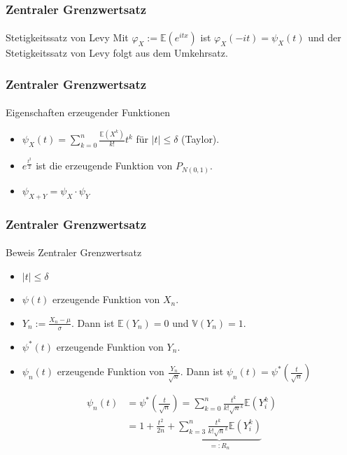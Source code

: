 \documentclass{beamer}
\begin{document}
\begin{frame}
    \frametitle{Zentraler Grenzwertsatz}
\framesubtitle{}

\begin{block}{Stetigkeitssatz von Levy}
Mit $\varphi_{X} := \mathbb{E}(e^{i tx})$  ist $\varphi _{X}(-it)=\psi_{X}(t)$ und der Stetigkeitssatz von Levy folgt aus dem Umkehrsatz.
\end{block}
 \end{frame}




\begin{frame}
    \frametitle{Zentraler Grenzwertsatz}
\framesubtitle{}
\begin{block}{Eigenschaften erzeugender Funktionen}
\begin{itemize}
\item $\psi_X(t) = \sum_{k= 0}^n \frac{\mathbb{E}(X^k)}{k!} t^k$ für $|t| \leq \delta$ (Taylor).
\item $e^{\frac{t^2}{2}}$ ist die erzeugende Funktion von $ P_{N(0,1)}$.
\item $\psi_{X +Y} = \psi_X \cdot \psi_Y$
\end{itemize}

\end{block}


 \end{frame}




\begin{frame}
    \frametitle{Zentraler Grenzwertsatz}
\framesubtitle{}

\begin{block}{Beweis Zentraler Grenzwertsatz}
\begin{itemize}
\item $|t| \leq \delta$
\item $\psi(t)$ erzeugende Funktion von $X_n$.
\item $Y_n := \frac{X_n - \mu}{\sigma}$. Dann ist $\mathbb{E}(Y_n) = 0$ und $\mathbb{V}(Y_n) = 1$.
\item $\psi^*(t)$ erzeugende Funktion von $Y_n$.
\item $\psi_n(t)$ erzeugende Funktion von $\frac{Y_n}{\sqrt{n}}$. Dann ist $\psi_n(t) = \psi^*(\frac{t}{\sqrt{n}})$ 
\end{itemize}
\begin{align*}
\psi_n(t) &= \psi^*(\frac{t}{\sqrt{n}}) =  \sum_{k= 0}^n \frac{t^k }{k! \sqrt{n}^k} \mathbb{E}(Y_i^k) \\
& = 1 + \frac{t^2}{2n} +  \underbrace{\sum_{k= 3}^n \frac{t^k }{k! \sqrt{n}^k} \mathbb{E}(Y_i^k)}_{=:R_n} 
\end{align*}
\end{block}

 \end{frame}
\end{document}
